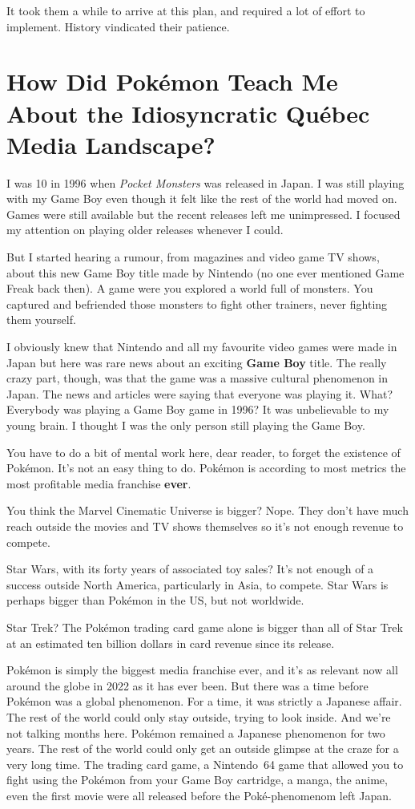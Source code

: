 \documentclass{book}
\begin{document}
It took them a while to arrive at this plan, and required a lot of effort to implement. History vindicated their patience.

\FloatBarrier\needspace{10mm}\section*{How Did Pokémon Teach Me About the Idiosyncratic Québec Media Landscape?}\nopagebreak[4]

I was 10 in 1996 when \emph{Pocket Monsters} was released in Japan. I was still playing with my Game Boy even though it felt like the rest of the world had moved on. Games were still available but the recent releases left me unimpressed. I focused my attention on playing older releases whenever I could.

But I started hearing a rumour, from magazines and video game TV shows, about this new Game Boy title made by Nintendo (no one ever mentioned Game Freak back then). A game were you explored a world full of monsters. You captured and befriended those monsters to fight other trainers, never fighting them yourself.

I obviously knew that Nintendo and all my favourite video games were made in Japan but here was rare news about an exciting \textbf{Game Boy} title. The really crazy part, though, was that the game was a massive cultural phenomenon in Japan. The news and articles were saying that everyone was playing it. What? Everybody was playing a Game Boy game in 1996? It was unbelievable to my young brain. I thought I was the only person still playing the Game Boy.

You have to do a bit of mental work here, dear reader, to forget the existence of Pokémon. It’s not an easy thing to do. Pokémon is according to most metrics the most profitable media franchise \textbf{ever}.

You think the Marvel Cinematic Universe is bigger? Nope. They don’t have much reach outside the movies and TV shows themselves so it’s not enough revenue to compete.

Star Wars, with its forty years of associated toy sales? It’s not enough of a success outside North America, particularly in Asia, to compete. Star Wars is perhaps bigger than Pokémon in the US, but not worldwide.

Star Trek? The Pokémon trading card game alone is bigger than all of Star Trek at an estimated ten billion dollars in card revenue since its release.

Pokémon is simply the biggest media franchise ever, and it’s as relevant now all around the globe in 2022 as it has ever been. But there was a time before Pokémon was a global phenomenon. For a time, it was strictly a Japanese affair. The rest of the world could only stay outside, trying to look inside. And we’re not talking months here. Pokémon remained a Japanese phenomenon for two years. The rest of the world could only get an outside glimpse at the craze for a very long time. The trading card game, a Nintendo 64 game that allowed you to fight using the Pokémon from your Game Boy cartridge, a manga, the anime, even the first movie were all released before the Poké-phenomenom left Japan.
\end{document}
